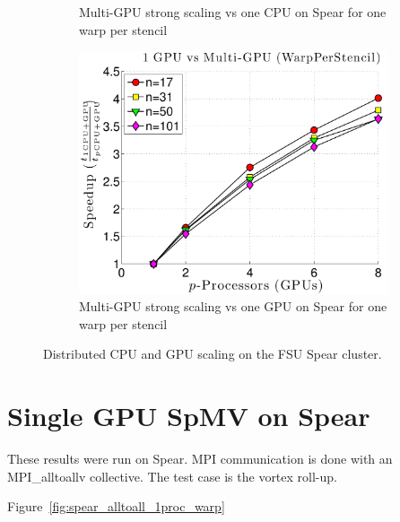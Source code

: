 \begin{figure}
\begin{subfigure}[t]{0.425\textwidth}
\caption{Multi-GPU strong scaling vs one CPU on Spear for one warp per stencil}
\label{fig:spear_alltoall_multigpu_vs_cpu_scaling}
\end{subfigure} 
\begin{subfigure}[t]{0.425\textwidth}
\centering
\includegraphics[width=1.0\textwidth]{../figures/spear_results/vortex/speedup_1GPU_vs_NGPU_WarpPerStencil-eps-converted-to.pdf}
\caption{Multi-GPU strong scaling vs one GPU on Spear for one warp per stencil}
\label{fig:spear_alltoall_multigpu_vs_gpu_scaling}
\end{subfigure} 
\caption{Distributed CPU and GPU scaling on the FSU Spear cluster.}
\end{figure} 




\section{Single GPU SpMV on Spear}

These results were run on Spear. MPI communication is done with an MPI\_alltoallv collective. The test case is the vortex roll-up. 

Figure~\ref{fig:spear_alltoall_1proc_warp} 

